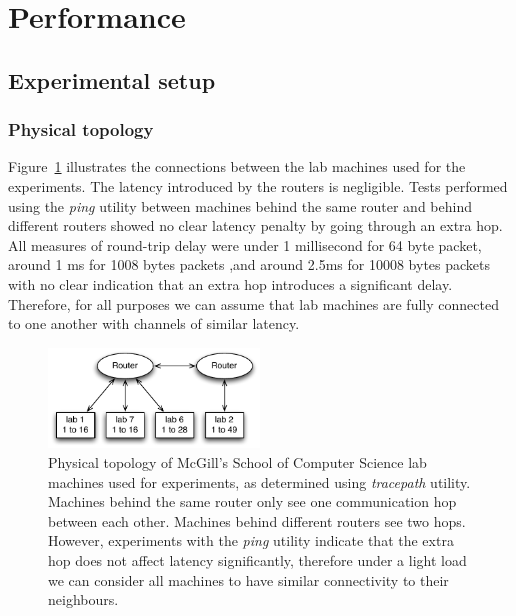 \section{Performance}
\label{sec:Performance}


\subsection{Experimental setup}

\subsubsection{Physical topology}

Figure~\ref{fig:PhysicalTopology} illustrates the connections between the lab machines used for the experiments. The latency introduced by the routers is negligible. Tests performed using the \textit{ping} utility between machines behind the same router and behind different routers showed no clear latency penalty by going through an extra hop. All measures of round-trip delay were under 1 millisecond for 64 byte packet, around 1 ms for 1008 bytes packets ,and around 2.5ms for 10008 bytes packets with no clear indication that an extra hop introduces a significant delay. Therefore, for all purposes we can assume that lab machines are fully connected to one another with channels of similar latency.

\begin{figure}[htb]
\begin{center}
\includegraphics[width=0.5\textwidth]{figures/PhysicalTopology}
\caption[Physical topology]{\label{fig:PhysicalTopology} Physical topology of McGill's School of Computer Science lab machines used for experiments, as determined using \textit{tracepath} utility. Machines behind the same router only see one communication hop between each other. Machines behind different routers see two hops. However, experiments with the \textit{ping} utility indicate that the extra hop does not affect latency significantly, therefore under a light load we can consider all machines to have similar connectivity to their neighbours.}
\end{center}
\end{figure}

